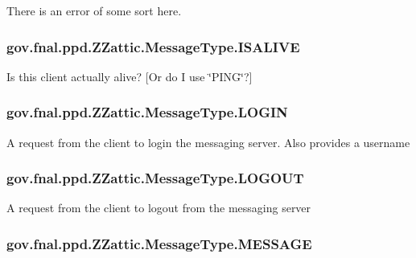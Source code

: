 There is an error of some sort here. \hypertarget{enumgov_1_1fnal_1_1ppd_1_1ZZattic_1_1MessageType_a3e7f3ad40f9b156630088a33669d66fc}{
\subsubsection[{I\-S\-A\-L\-I\-V\-E}]{\setlength{\rightskip}{0pt plus 5cm}gov.\-fnal.\-ppd.\-Z\-Zattic.\-Message\-Type.\-I\-S\-A\-L\-I\-V\-E}}\label{enumgov_1_1fnal_1_1ppd_1_1ZZattic_1_1MessageType_a3e7f3ad40f9b156630088a33669d66fc}
Is this client actually alive? \mbox{[}Or do I use \char`\"{}\-P\-I\-N\-G\char`\"{}?\mbox{]} \hypertarget{enumgov_1_1fnal_1_1ppd_1_1ZZattic_1_1MessageType_a1b2eaec8a1967aa6a8ff031be5981193}{
\subsubsection[{L\-O\-G\-I\-N}]{\setlength{\rightskip}{0pt plus 5cm}gov.\-fnal.\-ppd.\-Z\-Zattic.\-Message\-Type.\-L\-O\-G\-I\-N}}\label{enumgov_1_1fnal_1_1ppd_1_1ZZattic_1_1MessageType_a1b2eaec8a1967aa6a8ff031be5981193}
A request from the client to login the messaging server. Also provides a username \hypertarget{enumgov_1_1fnal_1_1ppd_1_1ZZattic_1_1MessageType_a30b69cd74904246b5e08ca7393f73280}{
\subsubsection[{L\-O\-G\-O\-U\-T}]{\setlength{\rightskip}{0pt plus 5cm}gov.\-fnal.\-ppd.\-Z\-Zattic.\-Message\-Type.\-L\-O\-G\-O\-U\-T}}\label{enumgov_1_1fnal_1_1ppd_1_1ZZattic_1_1MessageType_a30b69cd74904246b5e08ca7393f73280}
A request from the client to logout from the messaging server \hypertarget{enumgov_1_1fnal_1_1ppd_1_1ZZattic_1_1MessageType_a81039ad567bff174746f349bf501288a}{
\subsubsection[{M\-E\-S\-S\-A\-G\-E}]{\setlength{\rightskip}{0pt plus 5cm}gov.\-fnal.\-ppd.\-Z\-Zattic.\-Message\-Type.\-M\-E\-S\-S\-A\-G\-E}}\label{enumgov_1_1fnal_1_1ppd_1_1ZZattic_1_1MessageType_a81039ad567bff174746f349bf501288a}
